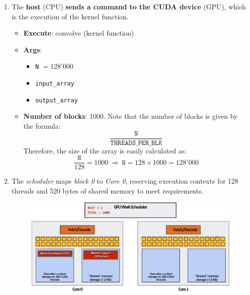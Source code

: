 \begin{enumerate}
    \item The \textbf{host} (CPU) \textbf{sends a command to the CUDA device} (GPU), which is the execution of the kernel function.
    \begin{itemize}
        \item \textbf{Execute}: convolve (kernel function)
        \item \textbf{Args}:
        \begin{itemize}
            \item \texttt{N} $= 128'000$
            \item \texttt{input\_array}
            \item \texttt{output\_array}
        \end{itemize}
        \item \textbf{Number of blocks}: 1000. Note that the number of blocks is given by the formula:
        \begin{equation*}
            \dfrac{
                \texttt{N}
            }{
                \texttt{THREADS\_PER\_BLK}
            }
        \end{equation*}
        Therefore, the size of the array is easily calculated as:
        \begin{equation*}
            \dfrac{\texttt{N}}{128} = 1000 \: \Rightarrow \: \texttt{N} = 128 \times 1000 = 128'000
        \end{equation*}
    \end{itemize}


    \item The \emph{scheduler} maps \emph{block 0} to \emph{Core 0}, reserving execution contexts for 128 threads and 520 bytes of shared memory to meet requirements.
    \begin{figure}[!htp]
        \centering
        \includegraphics[width=\textwidth]{img/cuda-convolve-kernel-2.pdf}
    \end{figure}


\end{enumerate}
